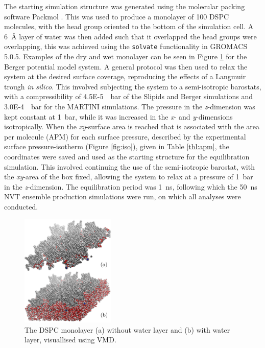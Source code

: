 \documentclass[amsmath,amssymb,twocolumn,superscriptaddress]{revtex4-1}
\begin{document}
The starting simulation structure was generated using the molecular packing
software Packmol \cite{martinez_packmol_2009}.
This was used to produce a monolayer of 100 DSPC molecules, with the head
group oriented to the bottom of the simulation cell.
A \SI{6}{\angstrom} layer of water was then added such that it overlapped
the head groups were overlapping, this was achieved using the
\texttt{solvate} functionality in GROMACS 5.0.5.
Examples of the dry and wet monolayer can be seen in Figure \ref{fig:drywet}
for the Berger potential model system.
A general protocol was then used to relax the system at the desired surface
coverage, reproducing the effects of a Langmuir trough \emph{in silico}.
This involved subjecting the system to a semi-isotropic barostats, with a
compressibility of \SI{4.5E-5}{\per\bar} of the Slipids and Berger
simulations and \SI{3.0E-4}{\per\bar} for the MARTINI simulations.
The pressure in the \emph{z}-dimension was kept constant at \SI{1}{\bar},
while it was increased in the \emph{x}- and \emph{y}-dimensions isotropically.
When the \emph{xy}-surface area is reached that is associated with the area
per molecule (APM) for each surface pressure, described by the experimental
surface pressure-isotherm (Figure \ref{fig:iso}), given in
Table \ref{tbl:apm}, the coordinates were saved and used as the starting
structure for the equilibration simulation.
This involved continuing the use of the semi-isotropic barostat, with
the \emph{xy}-area of the box fixed, allowing the system to relax at a
pressure of \SI{1}{\bar} in the \emph{z}-dimension.
The equilibration period was \SI{1}{\nano\second}, following which
the \SI{50}{\nano\second} NVT ensemble production simulations were run, on
which all analyses were conducted.
%
\begin{figure}[h]
\centering
  \includegraphics[width=0.4\textwidth]{dspcdrywet}
  \caption{The DSPC monolayer (a) without water layer and (b) with water
  layer, visuallised using VMD\cite{humphrey_vmd_1996}.}
  \label{fig:drywet}
\end{figure}
\end{document}
